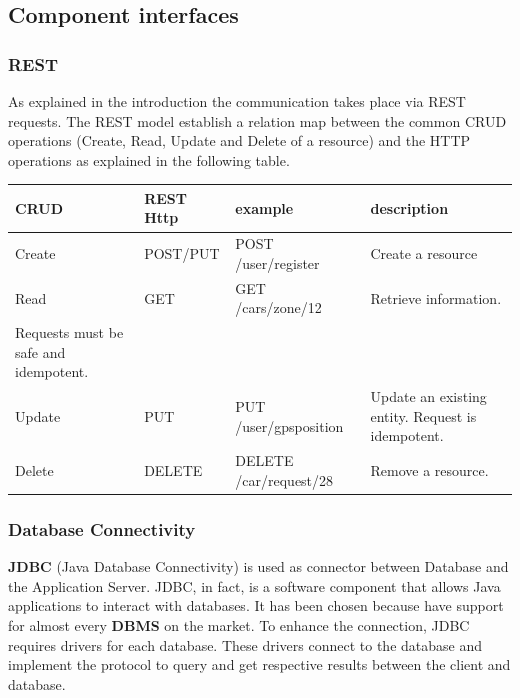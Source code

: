 \newpage

\subsection{Component interfaces} 
\subsubsection{REST}
As explained in the introduction the communication takes place via REST requests. The REST model establish a relation map between the common CRUD operations (Create, Read, Update and Delete of a resource) and the HTTP operations as explained in the following table.

\begin{center}
	\begin{adjustbox}{max width=\textwidth}	
		\begin{tabular}{|l|>{\raggedright}p{2.5cm}|>{\raggedright}p{4.5cm}|>{\raggedright}p{5cm}|}
			\hline 
			CRUD & REST Http & example &description\tabularnewline
			\hline 
			
			Create & POST/PUT & POST /user/register  & Create a resource \tabularnewline
			\hline 
			Read & GET & GET /cars/zone/12 & Retrieve information. \\  Requests must be safe and idempotent.\tabularnewline
			\hline 
			Update & PUT & PUT /user/gpsposition & Update an existing entity. Request is idempotent. \tabularnewline
			\hline 
			Delete & DELETE & DELETE /car/request/28 & Remove a resource.\tabularnewline
			\hline 
		\end{tabular}
	\end{adjustbox}	
	\par\end{center}

\subsubsection{Database Connectivity} \textbf{JDBC} (Java Database Connectivity) is used as connector between Database and the Application Server. JDBC, in fact, is a software component that allows Java applications to interact with databases. It has been chosen because have support for almost every \textbf{DBMS} on the market.
To enhance the connection, JDBC requires drivers for each database. These drivers connect to the database and implement the protocol to query and get respective results between the client and database. 


